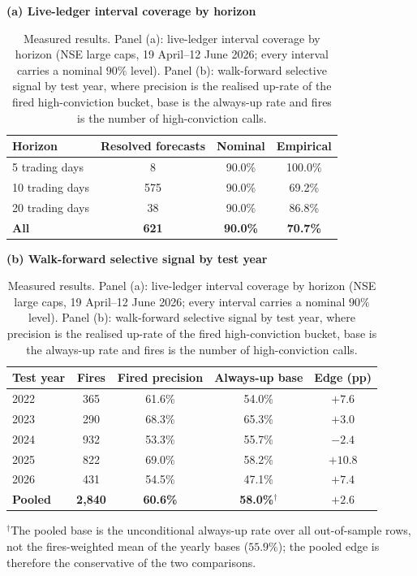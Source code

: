 \documentclass[12pt,a4paper]{article}
\begin{document}

\clearpage
\begin{table}[p]
\centering
\caption{Measured results. Panel (a): live-ledger interval coverage by horizon (NSE
large caps, 19 April--12 June 2026; every interval carries a nominal $90\%$ level).
Panel (b): walk-forward selective signal by test year, where precision is the
realised up-rate of the fired high-conviction bucket, base is the always-up rate and
fires is the number of high-conviction calls.}
\label{tab:results}
\begin{singlespace}
\small
\noindent\textbf{(a) Live-ledger interval coverage by horizon}\\[2pt]
\begin{tabular}{lccc}
\toprule
\textbf{Horizon} & \textbf{Resolved forecasts} & \textbf{Nominal} &
\textbf{Empirical} \\
\midrule
5 trading days  & 8   & 90.0\% & 100.0\% \\
10 trading days & 575 & 90.0\% & 69.2\%  \\
20 trading days & 38  & 90.0\% & 86.8\%  \\
\midrule
\textbf{All}    & \textbf{621} & \textbf{90.0\%} & \textbf{70.7\%} \\
\bottomrule
\end{tabular}

\vspace{1.4em}
\noindent\textbf{(b) Walk-forward selective signal by test year}\\[2pt]
\begin{tabular}{lcccc}
\toprule
\textbf{Test year} & \textbf{Fires} & \textbf{Fired precision} &
\textbf{Always-up base} & \textbf{Edge (pp)} \\
\midrule
2022 & 365 & 61.6\% & 54.0\% & $+7.6$ \\
2023 & 290 & 68.3\% & 65.3\% & $+3.0$ \\
2024 & 932 & 53.3\% & 55.7\% & $-2.4$ \\
2025 & 822 & 69.0\% & 58.2\% & $+10.8$ \\
2026 & 431 & 54.5\% & 47.1\% & $+7.4$ \\
\midrule
\textbf{Pooled} & \textbf{2{,}840} & \textbf{60.6\%} & \textbf{58.0\%$^{\dagger}$} &
\textbf{$+2.6$} \\
\bottomrule
\end{tabular}

\vspace{4pt}
{\footnotesize $^{\dagger}$The pooled base is the unconditional always-up rate over
all out-of-sample rows, not the fires-weighted mean of the yearly bases ($55.9\%$);
the pooled edge is therefore the conservative of the two comparisons.}
\end{singlespace}
\end{table}
\end{document}
